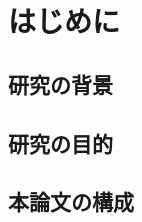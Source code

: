 \chapter{はじめに}
\label{chap:introduction}

\section{研究の背景}
\label{sec:background}

\section{研究の目的}
\label{sec:purpose}

\section{本論文の構成}
\label{sec:organization}
